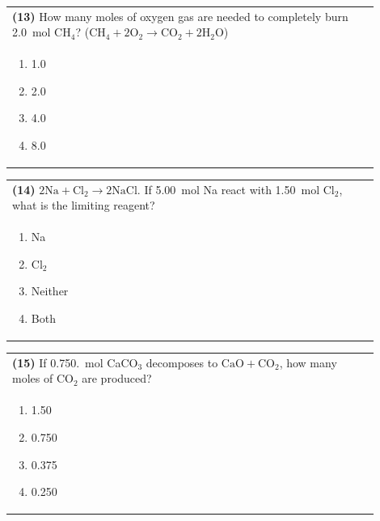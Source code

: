 \documentclass{article}
\begin{document}
{{\newpage

\noindent\begin{tabular}{|p{0.9\linewidth}|}
\hline
\textbf{(13)} How many moles of oxygen gas are needed to completely burn 2.0~mol CH$_4$? ($\text{CH}_4 + 2\text{O}_2 \rightarrow \text{CO}_2 + 2\text{H}_2\text{O}$)\\[0.2cm]

\begin{minipage}[t]{0.85\linewidth}
\begin{enumerate}[label=\alph*.]
\item 1.0
\item 2.0
\item 4.0
\item 8.0
\end{enumerate}
\end{minipage}\\[0.2cm]
\hline
\end{tabular}

\vspace{0.2cm}
\noindent\begin{tabular}{|p{0.9\linewidth}|}
\hline
\textbf{(14)} $2\text{Na} + \text{Cl}_2 \rightarrow 2\text{NaCl}$. If 5.00~mol Na react with 1.50~mol Cl$_2$, what is the limiting reagent?\\[0.2cm]

\begin{minipage}[t]{0.85\linewidth}
\begin{enumerate}[label=\alph*.]
\item Na
\item Cl$_2$
\item Neither
\item Both
\end{enumerate}
\end{minipage}\\[0.2cm]
\hline
\end{tabular}

\vspace{0.2cm}
\noindent\begin{tabular}{|p{0.9\linewidth}|}
\hline
\textbf{(15)} If 0.750.~mol CaCO$_3$ decomposes to $\text{CaO} + \text{CO}_2$, how many moles of CO$_2$ are produced?\\[0.2cm]

\begin{minipage}[t]{0.85\linewidth}
\begin{enumerate}[label=\alph*.]
\item 1.50
\item 0.750
\item 0.375
\item 0.250
\end{enumerate}
\end{minipage}\\[0.2cm]
\hline
\end{tabular}

}}
\end{document}
